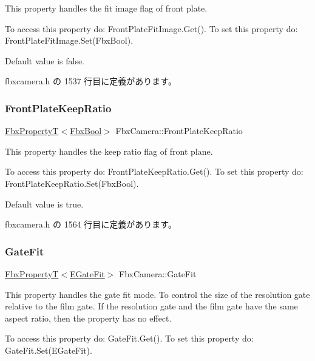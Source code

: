 This property handles the fit image flag of front plate.

To access this property do\+: Front\+Plate\+Fit\+Image.\+Get(). To set this property do\+: Front\+Plate\+Fit\+Image.\+Set(\+Fbx\+Bool).

Default value is false. 

 fbxcamera.\+h の 1537 行目に定義があります。

\mbox{\label{class_fbx_camera_aa4066eaf0f9d506db8b83353db3e4ef7}} 
\subsubsection{\texorpdfstring{Front\+Plate\+Keep\+Ratio}{FrontPlateKeepRatio}}
{\footnotesize\ttfamily \hyperlink{class_fbx_property_t}{Fbx\+PropertyT}$<$\hyperlink{fbxtypes_8h_a92e0562b2fe33e76a242f498b362262e}{Fbx\+Bool}$>$ Fbx\+Camera\+::\+Front\+Plate\+Keep\+Ratio}

This property handles the keep ratio flag of front plane.

To access this property do\+: Front\+Plate\+Keep\+Ratio.\+Get(). To set this property do\+: Front\+Plate\+Keep\+Ratio.\+Set(\+Fbx\+Bool).

Default value is true. 

 fbxcamera.\+h の 1564 行目に定義があります。

\mbox{\label{class_fbx_camera_a72892e0ca040266ffc5ede12235db68a}} 
\subsubsection{\texorpdfstring{Gate\+Fit}{GateFit}}
{\footnotesize\ttfamily \hyperlink{class_fbx_property_t}{Fbx\+PropertyT}$<$\hyperlink{class_fbx_camera_aeef0bf29c16fe5f08815fb33402330dd}{E\+Gate\+Fit}$>$ Fbx\+Camera\+::\+Gate\+Fit}

This property handles the gate fit mode. To control the size of the resolution gate relative to the film gate. If the resolution gate and the film gate have the same aspect ratio, then the property has no effect.

To access this property do\+: Gate\+Fit.\+Get(). To set this property do\+: Gate\+Fit.\+Set(\+E\+Gate\+Fit).

